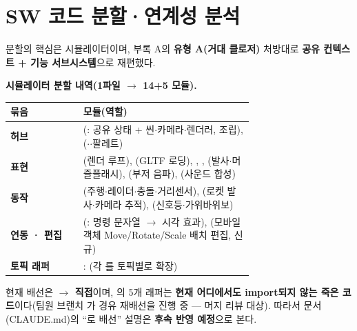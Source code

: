 \section{SW 코드 분할·연계성 분석}
분할의 핵심은 시뮬레이터이며, 부록 A의 \textbf{유형 A(거대 클로저)} 처방대로 \textbf{공유 컨텍스트
+ 기능 서브시스템}으로 재편했다.

\smallskip
\noindent\textbf{시뮬레이터 분할 내역(1파일 $\to$ 14+5 모듈).}
\begin{center}
\renewcommand{\arraystretch}{1.25}
\begin{tabularx}{\linewidth}{@{}>{\sffamily\bfseries}l L{0.70\linewidth}@{}}
\toprule
묶음 & 모듈(역할) \\
\midrule
허브 & (: 공유 상태 + 씬$\cdot$카메라$\cdot$렌더러,  조립), ($\cdot$$\cdot$팔레트) \\
표현 & (렌더 루프), (GLTF 로딩), , , (발사$\cdot$머즐플래시), (부저 음파), (사운드 합성) \\
동작 & (주행$\cdot$레이더$\cdot$충돌$\cdot$거리센서), (로켓 발사$\cdot$카메라 추적), (신호등$\cdot$가위바위보) \\
연동 · 편집 & (: 명령 문자열 $\to$ 시각 효과), (모바일 객체 Move/Rotate/Scale 배치 편집, 신규) \\
토픽 래퍼 & : (각 를 토픽별로 확장) \\
\bottomrule
\end{tabularx}
\end{center}

\begin{notebox}[현행 배선 사실 확인]
현재  배선은 \textbf{ $\to$  직접}이며,
의 5개 래퍼는 \textbf{현재 어디에서도 import되지 않는 죽은 코드}이다(팀원 브랜치
가  경유 재배선을 진행 중 --- 머지 리뷰 대상).
따라서 문서(CLAUDE.md)의 ``로 배선'' 설명은 \textbf{후속 반영 예정}으로 본다.
\end{notebox}


